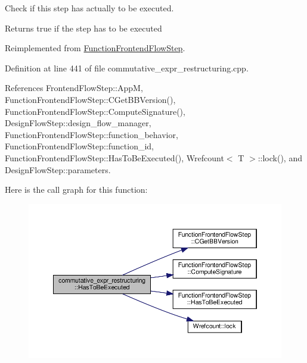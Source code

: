 Check if this step has actually to be executed. 

\begin{DoxyReturn}{Returns}
true if the step has to be executed 
\end{DoxyReturn}


Reimplemented from \hyperlink{classFunctionFrontendFlowStep_a12e786363530aa9533e4bd9380130d75}{Function\+Frontend\+Flow\+Step}.



Definition at line 441 of file commutative\+\_\+expr\+\_\+restructuring.\+cpp.



References Frontend\+Flow\+Step\+::\+AppM, Function\+Frontend\+Flow\+Step\+::\+C\+Get\+B\+B\+Version(), Function\+Frontend\+Flow\+Step\+::\+Compute\+Signature(), Design\+Flow\+Step\+::design\+\_\+flow\+\_\+manager, Function\+Frontend\+Flow\+Step\+::function\+\_\+behavior, Function\+Frontend\+Flow\+Step\+::function\+\_\+id, Function\+Frontend\+Flow\+Step\+::\+Has\+To\+Be\+Executed(), Wrefcount$<$ T $>$\+::lock(), and Design\+Flow\+Step\+::parameters.

Here is the call graph for this function\+:
\nopagebreak
\begin{figure}[H]
\begin{center}
\leavevmode
\includegraphics[width=350pt]{db/d8c/classcommutative__expr__restructuring_a9ea0a98a356901b31b212ad25255e784_cgraph}
\end{center}
\end{figure}
\mbox{\label{classcommutative__expr__restructuring_ae09db402c964798f3e6386e65095d0b3}} 
